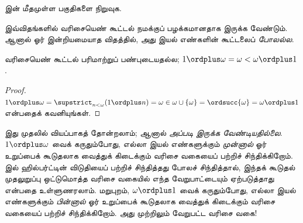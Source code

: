 \documentclass[../../../include/open-logic-section]{subfiles}
\begin{document}
\begin{prob}
 இன்
மீதமுள்ள பகுதிகளை நிறுவுக.
\end{prob}

இவ்விதங்களில் வரிசையெண் கூட்டல் நமக்குப் பழக்கமானதாக இருக்க வேண்டும்.
ஆனால் ஓர் இன்றியமையாத விதத்தில், அது இயல் எண்களின் கூட்டலைப்
\emph{போலல்ல}.

\begin{prop}
வரிசையெண் கூட்டல் {பரிமாற்றுப் பண்புடையதல்ல};
$1 \ordplus  \omega = \omega < \omega \ordplus  1$.
\end{prop}

\begin{proof}
$1 \ordplus  \omega = \supstrict_{n < \omega} (1 \ordplus n)
= \omega \in \omega \cup \{\omega\} = \ordsucc{\omega} =
\omega \ordplus  1$ என்பதைக் கவனியுங்கள்.
\end{proof}
\noindent
இது முதலில் வியப்பாகத் தோன்றலாம்; ஆனால் \emph{அப்படி
இருக்க வேண்டியதில்லை}. $1 \ordplus  \omega$ வைக் கருதும்போது,
எல்லா இயல் எண்களுக்கும் \emph{முன்னால்} ஓர் உறுப்பைக் கூடுதலாக
வைத்துக் கிடைக்கும் வரிசை வகையைப் பற்றிச் சிந்திக்கிறோம்.
 இல் ஹில்பர்ட்டின் விடுதியைப்
பற்றிச் சிந்தித்தது போலச் சிந்தித்தால், இந்தக் கூடுதல் முதலுறுப்பு
ஒட்டுமொத்த வரிசை வகையில் எந்த வேறுபாட்டையும் ஏற்படுத்தாது என்பதை
உள்ளுணரலாம். மறுபுறம், $\omega \ordplus  1$ வைக் கருதும்போது,
எல்லா இயல் எண்களுக்கும் \emph{பின்னால்} ஓர் உறுப்பைக் கூடுதலாக
வைத்துக் கிடைக்கும் வரிசை வகையைப் பற்றிச் சிந்திக்கிறோம்.
அது முற்றிலும் வேறுபட்ட வரிசை வகை!
\end{document}
